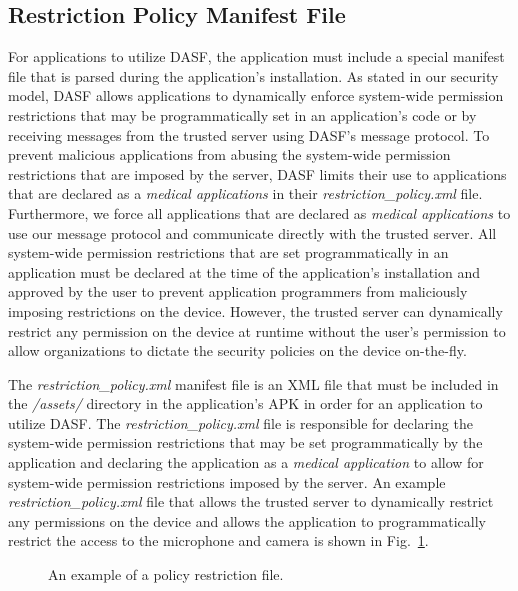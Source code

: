 \subsection{Restriction Policy Manifest File}  
For applications to utilize DASF, the application must include a special
manifest file that is parsed during the application's installation.  As stated
in our security model, DASF allows applications to dynamically enforce
system-wide permission restrictions that may be programmatically set in an
application's code or by receiving messages from the trusted server using
DASF's message protocol. To prevent malicious applications from abusing the
system-wide permission restrictions that are imposed by the server, DASF limits
their use to applications that are declared as a \textit{medical applications}
in their \textit{restriction\_policy.xml} file.  Furthermore, we force all
applications that are declared as \textit{medical applications} to use our
message protocol and communicate directly with the trusted server.  All
system-wide permission restrictions that are set programmatically in an
application must be declared at the time of the application's installation and
approved by the user to prevent application programmers from maliciously
imposing restrictions on the device. However, the trusted server can
dynamically restrict any permission on the device at runtime without the user's
permission to allow organizations to dictate the security policies on the
device on-the-fly. 

The \textit{restriction\_policy.xml} manifest file is an XML file that must be
included in the \textit{/assets/} directory in the application's APK in order
for an application to utilize DASF. The \textit{restriction\_policy.xml} file
is responsible for declaring the system-wide permission restrictions that may
be set programmatically by the application and declaring the application as a
\textit{medical application} to allow for system-wide permission restrictions
imposed by the server. An example \textit{restriction\_policy.xml} file that
allows the trusted server to dynamically restrict any permissions on the device
and allows the application to programmatically restrict the access to the
microphone and camera is shown in Fig.~\ref{fig:policy}.  

\begin{figure}[ht]
\centering
{}
\caption{An example of a policy restriction file.}
\label{fig:policy}
\end{figure}

